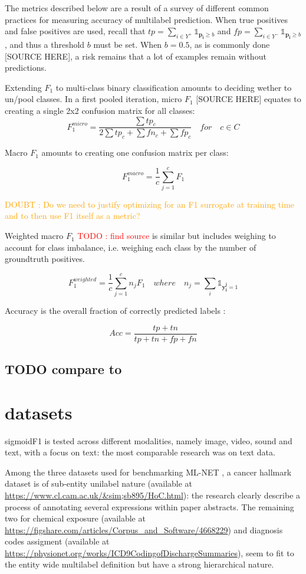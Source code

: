 \documentclass[sigconf,natbib,screen=true,review=true,anonymous]{acmart}
\newcommand\todo[1]{\textcolor{red}{TODO : #1}}
\newcommand\doubt[1]{\textcolor{orange}{DOUBT : #1}}
\begin{document}
The metrics described below are a result of a survey of different common practices for measuring accuracy of multilabel prediction. When true positives and false positives are used, recall that \(t p=\sum_{i \in Y^{+}} \mathds{1}_{\mathbf{p_i} \geq b}\) and \(f p=\sum_{i \in Y^{-}} \mathds{1}_{\mathbf{p_i} \geq b}\), and thus a threshold \(b\) must be set. When \(b = 0.5\), as is commonly done [SOURCE HERE], a risk remains that a lot of examples remain without predictions.

Extending \(F_1\) to multi-class binary classification amounts to deciding wether to un/pool classes.
In a first pooled iteration, micro \(F_1\) [SOURCE HERE] equates to creating a single 2x2 confusion matrix for all classes:
$$F_1^{micro} = \frac{\sum tp_c}{2 \sum tp_c + \sum fn_c + \sum fp_c} \quad for \quad c \in C$$

Macro \(F_1\) \cite{threshForF1} amounts to creating one confusion matrix per class:

$$F_1^{macro} = \frac{1}{c} \sum_{j=1}^c F_1$$

\doubt{Do we need to justify optimizing for an F1 surrogate at training time and to then use F1 itself as a metric?}

Weighted macro \(F_1\) \todo{find source} is similar but includes weighing to account for class imbalance, i.e. weighing each class by the number of groundtruth positives.

$$F_1^{weighted} = \frac{1}{c} \sum_{j=1}^c n_j F_1 \quad where \quad n_j = \sum_i \mathds{1}_{\mathbf{y_i^j} = 1}$$

Accuracy is the overall fraction of correctly predicted labels \cite{threshForF1}:

$$
A c c=\frac{t p+t n}{t p+t n+f p+f n}
$$


\subsection*{{\color{red}\bfseries\sffamily TODO} compare to  \cite{lossComp}}
\label{sec:org0c5f594}
\section{datasets}
\label{sec:org7feb22c}

sigmoidF1 is tested across different modalities, namely image, video, sound and text, with a focus on text: the most comparable research was on text data.


Among the three datasets used for benchmarking ML-NET \cite{multitaskLabel}, a cancer hallmark dataset is of sub-entity unilabel nature \cite{cancerHallmarks} (available at \url{https://www.cl.cam.ac.uk/\&sim;sb895/HoC.html}): the research clearly describe a process of annotating several expressions within paper abstracts. The remaining two for chemical exposure \cite{chemExposure} (available at \url{https://figshare.com/articles/Corpus\_and\_Software/4668229}) and diagnosis codes assigment \cite{diagnosisCode} (available at \url{https://physionet.org/works/ICD9CodingofDischargeSummaries}), seem to fit to the entity wide multilabel definition but have a strong hierarchical nature. 
\end{document}
